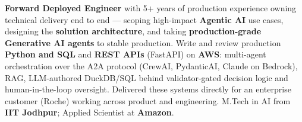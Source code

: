 \documentclass[letter,10pt]{article}
\begin{document}

\textbf{Forward Deployed Engineer} with 5+ years of production experience owning technical delivery end to end — scoping high-impact \textbf{Agentic AI} use cases, designing the \textbf{solution architecture}, and taking \textbf{production-grade Generative AI agents} to stable production.
Write and review production \textbf{Python and SQL} and \textbf{REST APIs} (FastAPI) on \textbf{AWS}: multi-agent orchestration over the A2A protocol (CrewAI, PydanticAI, Claude on Bedrock), RAG, LLM-authored DuckDB/SQL behind validator-gated decision logic and human-in-the-loop oversight.
Delivered these systems directly for an enterprise customer (Roche) working across product and engineering.
M.Tech in AI from \textbf{IIT Jodhpur}; Applied Scientist at \textbf{Amazon}.
\end{document}
